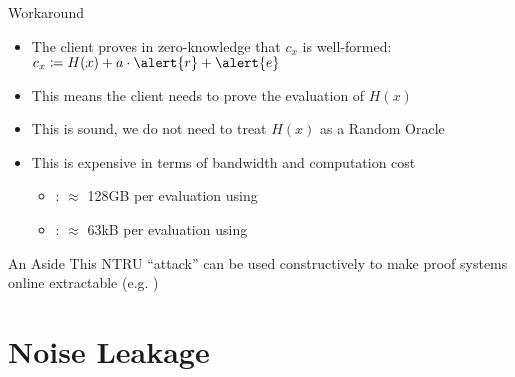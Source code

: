 \documentclass[xcolor=table,10pt,aspectratio=169]{beamer}
\begin{document}
\begin{frame}[label={sec:orgd569696}]{Workaround}
\begin{itemize}
\item The client proves in zero-knowledge that \(c_{x}\) is well-formed: \(c_{x} \coloneqq H(x) + a \cdot \alert{r} + \alert{e}\)
\item This means the client needs to prove the evaluation of \(H(x)\)
\item This is sound, we do not need to treat \(H(x)\) as a Random Oracle
\item This is expensive in terms of bandwidth and computation cost
\begin{itemize}
\item \cite{PKC:ADDS21}: \(\approx\) 128GB per evaluation using \cite{C:YAZXYW19}
\item \cite{AC:AlbGur24}: \(\approx\) 63kB per evaluation using \cite{C:BeuSei23}
\end{itemize}
\end{itemize}
\begin{alertblock}{An Aside}
This NTRU ``attack'' can be used constructively to make proof systems online extractable (e.g. \cite{EC:ADDG24})
\end{alertblock}
\end{frame}
\section{Noise Leakage}
\label{sec:org626fd9c}
\end{document}
